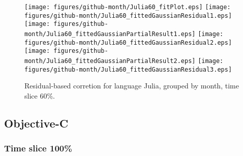 \begin{figure}[t]
\centering
{}
{\texttt{[image: figures/github-month/Julia60\_fitPlot.eps]}}
{\texttt{[image: figures/github-month/Julia60\_fittedGaussianResidual1.eps]}}
{\texttt{[image: figures/github-month/Julia60\_fittedGaussianPartialResult1.eps]}}
{\texttt{[image: figures/github-month/Julia60\_fittedGaussianResidual2.eps]}}
{\texttt{[image: figures/github-month/Julia60\_fittedGaussianPartialResult2.eps]}}
{\texttt{[image: figures/github-month/Julia60\_fittedGaussianResidual3.eps]}}
\caption{Residual-based corretion for language Julia, grouped by month, time slice 60\%.}
\end{figure}


\FloatBarrier


\subsection{Objective-C}

\subsubsection{Time slice 100\%}

